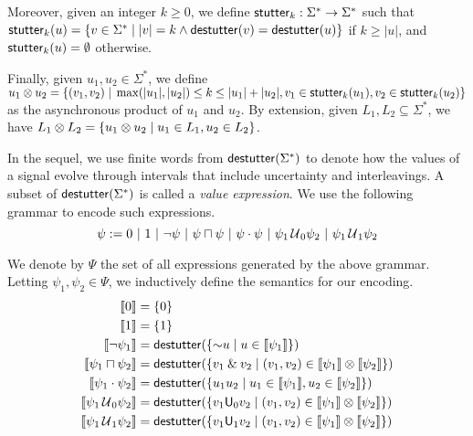 Moreover, given an integer $k \geq 0$, we define $\mathsf{stutter}_k : \Sigma^* \to \Sigma^*$ such that $\stutter_k(u) = \{v \in \Sigma^* \st |v| = k \land \destutter(v) = \destutter(u)\}$ if $k \geq |u|$, and $\mathsf{stutter}_k(u) = \emptyset$ otherwise.

Finally, given $u_1, u_2 \in \Sigma^*$, we define $u_1 \otimes u_2 = \{ (v_1,v_2) \st \max(|u_1|, |u_2|) \leq k \leq |u_1| + |u_2|, v_1 \in \stutter_k(u_1), v_2 \in \stutter_k(u_2) \}$ as the asynchronous product of $u_1$ and $u_2$.
By extension, given $L_1, L_2 \subseteq \Sigma^*$, we have $L_1 \otimes L_2 = \{ u_1 \otimes u_2 \st u_1 \in L_1, u_2 \in L_2 \}$.

In the sequel, we use finite words from $\mathsf{destutter}(\Sigma^*)$ to denote how the values of a signal evolve through intervals that include uncertainty and interleavings.
A subset of $\mathsf{destutter}(\Sigma^*)$ is called a \emph{value expression}.
We use the following grammar to encode such expressions. 
$$ \psi := 0 ~|~ 1 ~|~ \lnot \psi ~|~ \psi \sqcap \psi  ~|~ \psi \cdot \psi ~|~ \psi_1 \,\mathcal{U}\,_{\!0} \psi_2 ~|~ \psi_1 \,\mathcal{U}\,_{\!1} \psi_2 $$  %

We denote by $\Psi$ the set of all expressions generated by the above grammar.
Letting $\psi_1, \psi_2 \in \Psi$, we inductively define the semantics for our encoding.
\begin{align*}
		\llbracket 0 \rrbracket &=  \{ 0 \} \\
		\llbracket 1 \rrbracket &=  \{ 1 \} \\
		\llbracket \lnot \psi_1 \rrbracket &= \destutter(\{ \BitNeg u \st u \in \llbracket \psi_1 \rrbracket \}) \\
		\llbracket \psi_1 \sqcap \psi_2 \rrbracket &= \destutter(\{ v_1 \BitAnd v_2 \st (v_1,v_2) \in \llbracket \psi_1 \rrbracket \otimes \llbracket \psi_2 \rrbracket \}) \\
		\llbracket \psi_1 \cdot \psi_2 \rrbracket &= \destutter(\{ u_1 u_2 \st u_1 \in \llbracket \psi_1 \rrbracket, u_2 \in \llbracket \psi_2 \rrbracket \}) \\
		\llbracket \psi_1 \until_{\!0} \psi_2 \rrbracket &= \destutter(\{ v_1 \mathsf{U}_0 v_2  \st (v_1,v_2) \in \llbracket \psi_1 \rrbracket \otimes \llbracket \psi_2 \rrbracket \}) \\
		\llbracket \psi_1 \until_{\!1} \psi_2 \rrbracket &= \destutter(\{ v_1 \mathsf{U}_1 v_2  \st (v_1,v_2) \in \llbracket \psi_1 \rrbracket \otimes \llbracket \psi_2 \rrbracket \}) \\
\end{align*}

